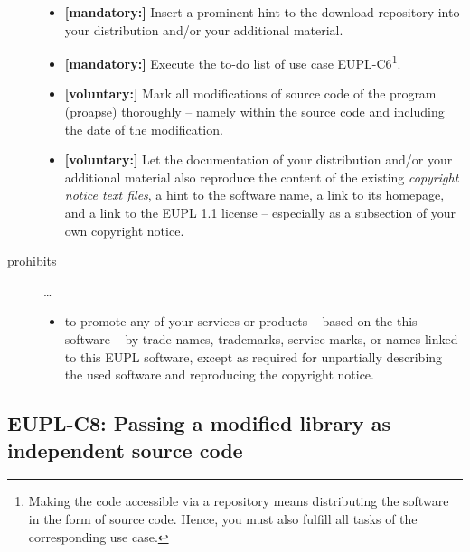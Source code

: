 \begin{description}
\begin{itemize}
  \item \textbf{[mandatory:]} Insert a prominent hint to the download repository
  into your distribution and/or your additional material.
    
  \item \textbf{[mandatory:]} Execute the to-do list of use case EUPL-C6\footnote{
  Making the code accessible via a repository means distributing the software in
  the form of source code. Hence, you must also fulfill all tasks of the
  corresponding use case.}.
  
  \item \textbf{[voluntary:]} Mark all modifications of source code of the
  program (proapse) thoroughly -- namely within the
  source code and including the date of the modification.
 
  \item \textbf{[voluntary:]} Let the documentation of your distribution and/or
  your additional material  also reproduce the content of the existing
  \emph{copyright notice text files}, a hint to the software name, a link to its
  homepage, and a link to the EUPL 1.1 license -- especially as a subsection of
  your own copyright notice.


\end{itemize}

\item[prohibits] \ldots
\begin{itemize}
  \item to promote any of your services or products -- based on the this software
  -- by trade names, trademarks, service marks, or names linked to this EUPL
  software, except as required for unpartially describing the used software and
  reproducing the copyright notice.
\end{itemize}

\end{description}

\subsection{EUPL-C8: Passing a modified library as independent source code}
\label{OSUC-08S-EUPL}

